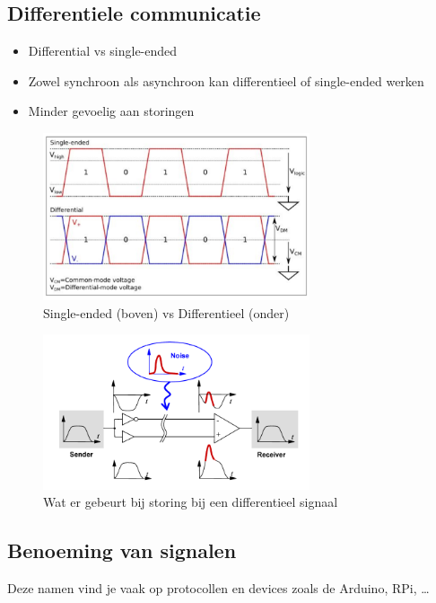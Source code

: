 \documentclass{article}
\begin{document}
\subsection{Differentiele communicatie}
\begin{itemize}
    \item Differential vs single-ended
    \item Zowel synchroon als asynchroon kan differentieel of single-ended werken
    \item Minder gevoelig aan storingen
\end{itemize}


\begin{figure}[H]
    \centering
    \includegraphics[width=0.7\textwidth]{Screenshot_20200323_123305.png}
    \caption{Single-ended (boven) vs Differentieel (onder)}
\end{figure}

\begin{figure}[H]
    \centering
    \includegraphics[width=0.7\textwidth]{Screenshot_20200323_123231.png}
    \caption{Wat er gebeurt bij storing bij een differentieel signaal}
\end{figure}

\subsection{Benoeming van signalen}
Deze namen vind je vaak op protocollen en devices zoals de Arduino, RPi, \dots
\end{document}
